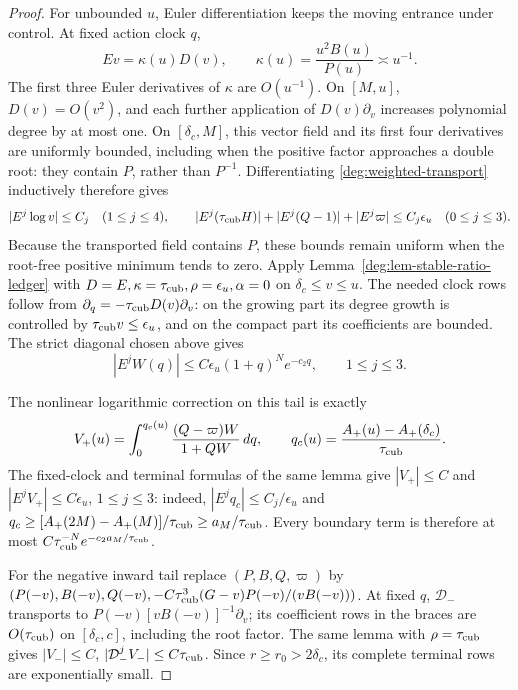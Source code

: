 \begin{proof}
For unbounded \(u\), Euler differentiation keeps the moving entrance
under control. At fixed action clock \(q\),
\begin{equation}
 Ev=\kappa(u)D(v),\qquad
 \kappa(u)=\frac{u^2B(u)}{P(u)}\asymp u^{-1}.
 \label{deg:weighted-transport}
\end{equation}
The first three Euler derivatives of \(\kappa\) are \(O(u^{-1})\).
On \([M,u]\), \(D(v)=O(v^2)\), and each further application of
\(D(v)\partial_v\) increases polynomial degree by at most one.
On \([\delta_c,M]\), this vector field and its first four derivatives
are uniformly bounded, including when the positive factor approaches a
double root: they contain \(P\), rather than \(P^{-1}\).
Differentiating \eqref{deg:weighted-transport} inductively therefore gives
\[
 |E^j\log v|\le C_j\quad(1\le j\le4),\qquad
 |E^j(\tau_{\rm cub} H)|+|E^j(Q-1)|+|E^j\varpi|
       \le C_j\epsilon_u\quad(0\le j\le3).
\]
Because the transported field contains \(P\), these bounds remain
uniform when the root-free positive minimum tends to zero.
Apply Lemma~\ref{deg:lem-stable-ratio-ledger} with
\(D=E,\kappa=\tau_{\rm cub},\rho=\epsilon_u,\alpha=0\) on
\(\delta_c\le v\le u\).
The needed clock rows follow from \(\partial_q=-\tau_{\rm cub} D(v)\partial_v\):
on the growing part its degree growth is controlled by
\(\tau_{\rm cub} v\le\epsilon_u\), and on the compact part its coefficients
are bounded. The strict diagonal chosen above gives
\begin{equation}\label{deg:weighted-kernel-jets}
 |E^jW(q)|\le C\epsilon_u(1+q)^Ne^{-c_2q},\qquad1\le j\le3.
\end{equation}

The nonlinear logarithmic correction on this tail is exactly
\[
 V_+(u)=\int_0^{q_c(u)}
       \frac{(Q-\varpi)W}{1+QW}\,dq,
 \qquad q_c(u)=\frac{A_+(u)-A_+(\delta_c)}{\tau_{\rm cub}}.
\]
The fixed-clock and terminal formulas of the same lemma give \(|V_+|\le C\) and
\(|E^jV_+|\le C\epsilon_u\), \(1\le j\le3\): indeed,
\(|E^jq_c|\le C_j/\epsilon_u\) and
\(q_c\ge[A_+(2M)-A_+(M)]/\tau_{\rm cub}\ge a_M/\tau_{\rm cub}\).
Every boundary term is therefore at most
\(C\tau_{\rm cub}^{-N}e^{-c_2a_M/\tau_{\rm cub}}\).

For the negative inward tail replace \((P,B,Q,\varpi)\) by
\((P(-v),B(-v),Q(-v),-C\tau_{\rm cub}^3(G-v)P(-v)/(vB(-v)))\).
At fixed \(q\), \(\mathcal D_-\) transports to
\(P(-v)[vB(-v)]^{-1}\partial_v\);
its coefficient rows in the braces are \(O(\tau_{\rm cub})\) on
\([\delta_c,c]\), including the root factor. The same lemma with
\(\rho=\tau_{\rm cub}\) gives \(|V_-|\le C\),
\(|\mathcal D_-^jV_-|\le C\tau_{\rm cub}\). Since \(r\ge r_0>2\delta_c\),
its complete terminal rows are exponentially small.


\end{proof}
